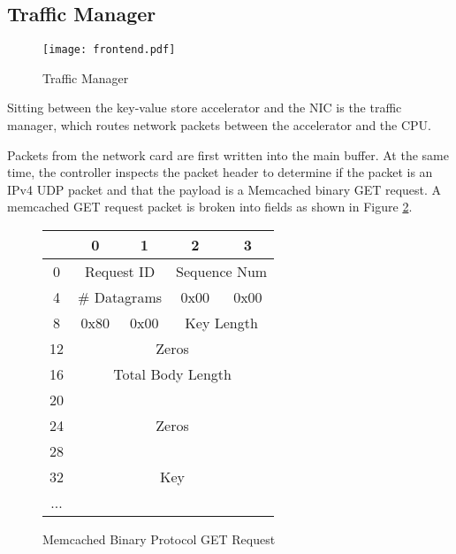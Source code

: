 \subsection{Traffic Manager}
\begin{figure}
    \begin{center}
\texttt{[image: frontend.pdf]}
        \caption{Traffic Manager}
        \label{fig:frontend}
    \end{center}
\end{figure}

Sitting between the key-value store accelerator and the NIC is the traffic
manager, which routes network packets between the accelerator and the CPU.

Packets from the network card are first written into the main buffer.
At the same time, the controller inspects the packet header to determine if
the packet is an IPv4 UDP packet and that the payload is a Memcached binary
GET request. A memcached GET request packet is broken into fields as shown in 
Figure \ref{fig:getreq}.

\begin{figure}
\begin{center}
    \begin{tabular}{|c|c|c|c|c|}
        \hline
          & 0 & 1 & 2 & 3 \\
        \hline
        0 & \multicolumn{2}{|c}{Request ID} & \multicolumn{2}{|c|}{Sequence Num} \\
        \hline
        4 & \multicolumn{2}{|c|}{\# Datagrams} & 0x00 & 0x00 \\
        \hline
        8 & 0x80 & 0x00 & \multicolumn{2}{c|}{Key Length} \\
        \hline
        12 & \multicolumn{4}{|c|}{Zeros} \\
        \hline
        16 & \multicolumn{4}{|c|}{Total Body Length} \\
        \hline
        20 & \multicolumn{4}{|c|}{\multirow{3}{*}{Zeros}} \\
        \cline{1-1}
        24 & \multicolumn{4}{|c|}{} \\
        \cline{1-1}
        28 & \multicolumn{4}{|c|}{} \\
        \hline
        32 & \multicolumn{4}{|c|}{Key} \\
        ... & \multicolumn{4}{|c|}{} \\
        \hline
    \end{tabular}
        \caption{Memcached Binary Protocol GET Request}
        \label{fig:getreq}
    \end{center}
\end{figure}


